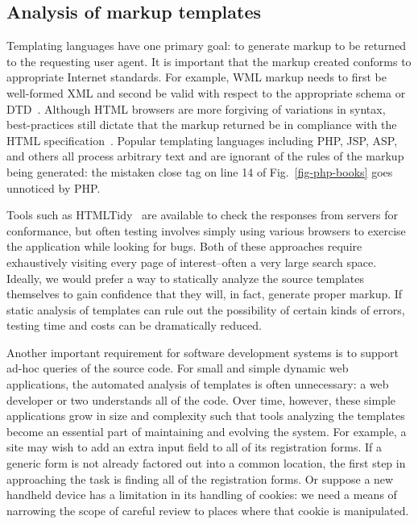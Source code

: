 \documentclass{www2003-submission}
\newcommand{\figref}[1]{Fig.~\ref{fig-#1}}
\begin{document}
\subsection{Analysis of markup templates}

Templating languages have one primary goal: to generate markup to be
returned to the requesting user agent.  It is important that the
markup created conforms to appropriate Internet standards.  For
example, WML markup needs to first be well-formed XML and second be
valid with respect to the appropriate schema or DTD~\cite{WML12}.
Although HTML browsers are more forgiving of variations in syntax,
best-practices still dictate that the markup returned be in compliance
with the HTML specification~\cite{HTML4}.  Popular templating
languages including PHP, JSP, ASP, and others all process arbitrary
text and are ignorant of the rules of the markup being generated: the
mistaken close tag on line 14 of \figref{php-books} goes unnoticed by
PHP.

Tools such as HTMLTidy~\cite{HTMLTidy} are available to check the
responses from servers for conformance, but often testing involves
simply using various browsers to exercise the application while
looking for bugs.  Both of these approaches require exhaustively
visiting every page of interest--often a very large search space.
Ideally, we would prefer a way to statically analyze the source templates
themselves to gain confidence that they will, in fact, generate proper
markup.  If static analysis of templates can rule out the possibility
of certain kinds of errors, testing time and costs can be dramatically
reduced.

Another important requirement for software development systems is to
support ad-hoc queries of the source code. For small and simple
dynamic web applications, the automated analysis of templates is often
unnecessary: a web developer or two understands all of the code.  Over
time, however, these simple applications grow in size and complexity
such that tools analyzing the templates become an essential part of
maintaining and evolving the system. For example, a site may wish to
add an extra input field to all of its registration forms.  If a
generic form is not already factored out into a common location, the
first step in approaching the task is finding all of the registration
forms.  Or suppose a new handheld device has a limitation in its
handling of cookies: we need a means of narrowing the scope of careful
review to places where that cookie is manipulated.
\end{document}
